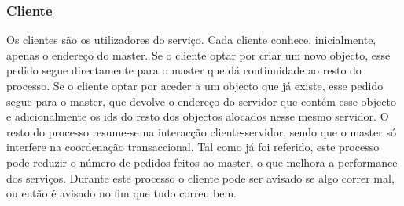 \subsubsection{Cliente}

Os clientes são os utilizadores do serviço. Cada cliente conhece, inicialmente, apenas o endereço do master. Se o cliente optar por criar um novo objecto, esse pedido segue directamente para o master que dá continuidade ao resto do processo. Se o cliente optar por aceder a um objecto que já existe, esse pedido segue para o master, que devolve o endereço do servidor que contém esse objecto e adicionalmente os ids do resto dos objectos alocados nesse mesmo servidor. O resto do processo resume-se na interacção cliente-servidor, sendo que o master só interfere na coordenação transaccional. Tal como já foi referido, este processo pode reduzir o número de pedidos feitos ao master, o que melhora a performance dos serviços. Durante este processo o cliente pode ser avisado se algo correr mal, ou então é avisado no fim que tudo correu bem. 